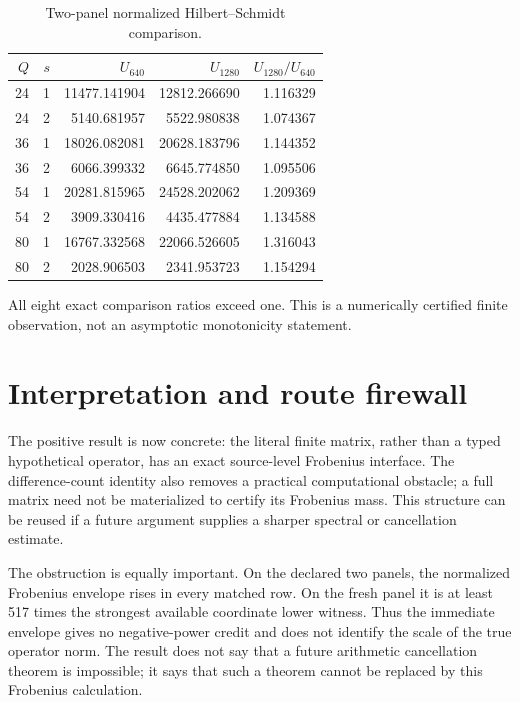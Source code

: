 \documentclass[10pt,a4paper]{article}
\begin{document}
\begin{table}[t]
\centering
\setlength{\tabcolsep}{5pt}
\small
\caption{Two-panel normalized Hilbert--Schmidt comparison.}
\label{tab:scale}
\begin{tabular}{rrr r r}
\toprule
$Q$ & $s$ & $U_{640}$ & $U_{1280}$ & $U_{1280}/U_{640}$\\
\midrule
24&1&11477.141904&12812.266690&1.116329\\
24&2& 5140.681957& 5522.980838&1.074367\\
36&1&18026.082081&20628.183796&1.144352\\
36&2& 6066.399332& 6645.774850&1.095506\\
54&1&20281.815965&24528.202062&1.209369\\
54&2& 3909.330416& 4435.477884&1.134588\\
80&1&16767.332568&22066.526605&1.316043\\
80&2& 2028.906503& 2341.953723&1.154294\\
\bottomrule
\end{tabular}
\end{table}

All eight exact comparison ratios exceed one.  This is a numerically
certified finite observation, not an asymptotic monotonicity statement.

\section{Interpretation and route firewall}

The positive result is now concrete: the literal finite matrix, rather than a
typed hypothetical operator, has an exact source-level Frobenius interface.
The difference-count identity also removes a practical computational
obstacle; a full matrix need not be materialized to certify its Frobenius
mass.  This structure can be reused if a future argument supplies a sharper
spectral or cancellation estimate.

The obstruction is equally important.  On the declared two panels, the
normalized Frobenius envelope rises in every matched row.  On the fresh panel
it is at least 517 times the strongest available coordinate lower witness.
Thus the immediate envelope gives no negative-power credit and does not
identify the scale of the true operator norm.  The result does not say that a
future arithmetic cancellation theorem is impossible; it says that such a
theorem cannot be replaced by this Frobenius calculation.
\end{document}

